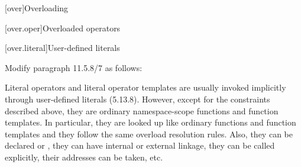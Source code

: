 
\setcounter{chapter}{10}
[over]{Overloading}

\setcounter{section}{4}
[over.oper]{Overloaded operators}

\setcounter{subsection}{7}
[over.literal]{User-defined literals}

\noindent
Modify paragraph 11.5.8/7 as follows:
\begin{std.txt}
    \resetalinea[6]
    \alinea
    \enternote
    Literal operators and literal operator templates are usually invoked 
    implicitly through user-defined literals (5.13.8). However, except for 
    the constraints described above, they are ordinary namespace-scope 
    functions and function templates. In particular, they are looked up 
    like ordinary functions and function templates and they follow the same 
    overload resolution rules. Also, they can be declared 
     or , 
    they can have internal or external linkage, they can be called explicitly, 
    their addresses can be taken, etc.
    \exitnote
\end{std.txt}
